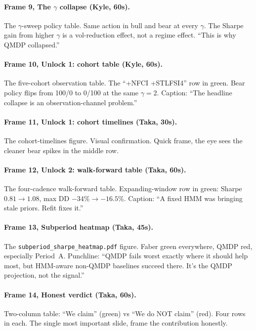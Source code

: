 \documentclass[11pt]{article}
\begin{document}
\paragraph{Frame 9, The $\gamma$ collapse (Kyle, 60s).} The $\gamma$-sweep policy table. Same action in bull and bear at every $\gamma$. The Sharpe gain from higher $\gamma$ is a vol-reduction effect, not a regime effect. ``This is why QMDP collapsed.''

\paragraph{Frame 10, Unlock 1: cohort table (Kyle, 60s).} The five-cohort observation table. The ``+NFCI +STLFSI4'' row in green. Bear policy flips from 100/0 to 0/100 at the same $\gamma = 2$. Caption: ``The headline collapse is an observation-channel problem.''

\paragraph{Frame 11, Unlock 1: cohort timelines (Taka, 30s).} The cohort-timelines figure. Visual confirmation. Quick frame, the eye sees the cleaner bear spikes in the middle row.

\paragraph{Frame 12, Unlock 2: walk-forward table (Taka, 60s).} The four-cadence walk-forward table. Expanding-window row in green: Sharpe $0.81 \to 1.08$, max DD $-34\% \to -16.5\%$. Caption: ``A fixed HMM was bringing stale priors. Refit fixes it.''

\paragraph{Frame 13, Subperiod heatmap (Taka, 45s).} The \texttt{subperiod\_sharpe\_heatmap.pdf} figure. Faber green everywhere, QMDP red, especially Period~A. Punchline: ``QMDP fails worst exactly where it should help most, but HMM-aware non-QMDP baselines succeed there. It's the QMDP projection, not the signal.''

\paragraph{Frame 14, Honest verdict (Taka, 60s).} Two-column table: ``We claim'' (green) vs ``We do NOT claim'' (red). Four rows in each. The single most important slide, frame the contribution honestly.
\end{document}
